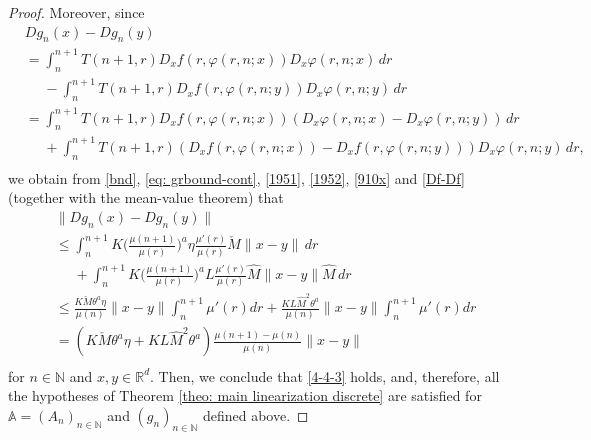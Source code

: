 \documentclass[reqno, a4paper, 10pt]{amsart}
\theoremstyle{plain}
\numberwithin{equation}{section}
\theoremstyle{remark}
\renewcommand{\phi}{\varphi}
\def\N{\mathbb{N}}
\def\R{\mathbb{R}}
\begin{document}
\begin{proof}
Moreover, since
\[
\begin{split}
&Dg_{n}(x)-Dg_{n}(y)
\\
&=\int_n^{n+1}T(n+1, r)D_xf(r, \phi(r, n;x))D_x\phi(r, n;x)\, dr \\
&\phantom{=}-\int_n^{n+1}T(n+1, r)D_xf(r, \phi(r, n;y))D_x\phi(r, n;y)\, dr \\
&=\int_n^{n+1}T(n+1, r)D_xf(r, \phi(r, n;x))(D_x\phi(r, n;x)-D_x\phi(r, n;y))\, dr \\
&\phantom{=}+\int_n^{n\!+\!1}T(n+1, r)(D_xf(r, \phi(r, n;x))
\!-\!D_xf(r, \phi(r, n;y)))D_x\phi(r, n;y)\, dr, \\
\end{split}
\]
we obtain from \eqref{bnd}, \eqref{eq: grbound-cont}, \eqref{1951}, \eqref{1952}, \eqref{910x} and \eqref{Df-Df} (together with the mean-value
theorem) that
\[
\begin{split}
&\lVert Dg_{n}(x)-Dg_{n}(y)  \rVert
\\
&\le \int_n^{n+1}K \bigg (\frac{\mu(n+1)}{\mu(r)} \bigg )^a \eta \frac{\mu'(r)}{\mu(r)} \check M\lVert x-y\rVert\, dr \\
&\phantom{\le}+\int_n^{n+1}K \bigg (\frac{\mu(n+1)}{\mu(r)} \bigg )^a L\frac{\mu'(r) }{\mu(r)} \hat M  \lVert x-y\rVert \hat M  \, dr \\
&\le \frac{K\check M \theta^{a}\eta}{\mu(n)} \|x-y\| \int_{n}^{n+1}\mu'(r)dr +\frac{K L \hat M^2 \theta^{a} }{\mu(n)} \|x-y\| \int_{n}^{n+1}\mu'(r)dr\\
&= \left(K\check M \theta^{a}\eta + K L \hat M^2 \theta^{a}\right) \frac{\mu(n+1)-\mu(n)}{\mu(n)} \|x-y\|\\
\end{split}
\]
for $n\in \N$ and $x, y\in \R^d$. Then, we conclude that \eqref{4-4-3} holds, and, therefore, all the hypotheses of Theorem \ref{theo: main linearization discrete} are satisfied for $\mathbb{A}=(A_n)_{n\in \N}$ and $(g_n)_{n\in \N}$ defined above. 


\end{proof}
\end{document}
